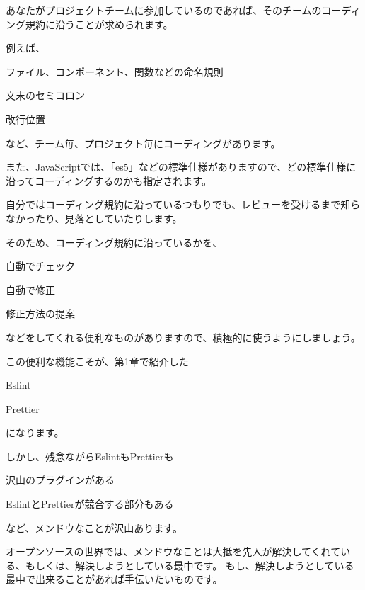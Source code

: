 あなたがプロジェクトチームに参加しているのであれば、そのチームのコーディング規約に沿うことが求められます。

例えば、

\begin{starteritemize}
\item ファイル、コンポーネント、関数などの命名規則
\item 文末のセミコロン
\item 改行位置
\end{starteritemize}

など、チーム毎、プロジェクト毎にコーディングがあります。

また、JavaScriptでは、「es5」などの標準仕様がありますので、どの標準仕様に沿ってコーディングするのかも指定されます。

自分ではコーディング規約に沿っているつもりでも、レビューを受けるまで知らなかったり、見落としていたりします。

そのため、コーディング規約に沿っているかを、

\begin{starteritemize}
\item 自動でチェック
\item 自動で修正
\item 修正方法の提案
\end{starteritemize}

などをしてくれる便利なものがありますので、積極的に使うようにしましょう。

この便利な機能こそが、第1章で紹介した

\begin{starteritemize}
\item Eslint
\item Prettier
\end{starteritemize}

になります。

しかし、残念ながらEslintもPrettierも

\begin{starteritemize}
\item 沢山のプラグインがある
\item EslintとPrettierが競合する部分もある
\end{starteritemize}

など、メンドウなことが沢山あります。

オープンソースの世界では、メンドウなことは大抵を先人が解決してくれている、もしくは、解決しようとしている最中です。
もし、解決しようとしている最中で出来ることがあれば手伝いたいものです。


